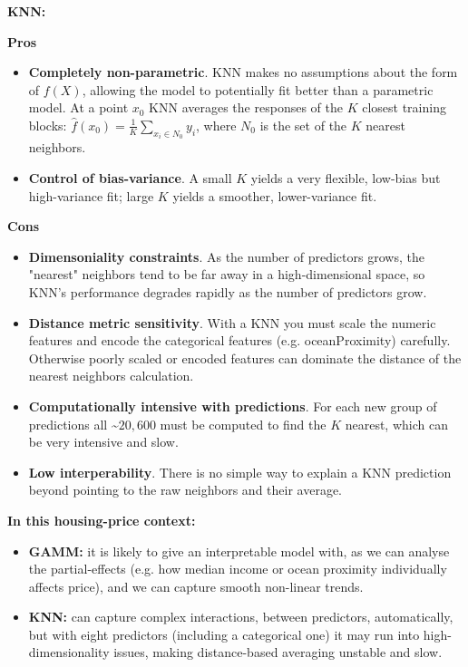 \documentclass[
]{article}
\begin{document}
\noindent \large \textbf{KNN:} \normalsize

\noindent \textbf{Pros}

\begin{itemize}
  \item \textbf{Completely non-parametric}. KNN makes no assumptions about the form of $f(X)$, allowing the model to potentially fit better than a      parametric model. At a point $x_0$ KNN averages the responses of the $K$ closest training blocks: $\hat{f}(x_{0}) = \frac{1}{K} \sum_{x_{i}           \in N_{0}}{y_i}$, where $N_0$ is the set of the $K$ nearest neighbors.
  \item \textbf{Control of bias-variance}. A small $K$ yields a very flexible, low-bias but high-variance fit; large $K$ yields a smoother,      lower-variance fit.
\end{itemize}

\noindent \textbf{Cons}

\begin{itemize}
  \item \textbf{Dimensoniality constraints}. As the number of predictors grows, the "nearest" neighbors tend to be far away in a high-dimensional       space, so KNN's performance degrades rapidly as the number of predictors grow.
  \item \textbf{Distance metric sensitivity}. With a KNN you must scale the numeric features and encode the categorical features (e.g.                  oceanProximity) carefully. Otherwise poorly scaled or encoded features can dominate the distance of the nearest neighbors calculation.
  \item \textbf{Computationally intensive with predictions}. For each new group of predictions all \textasciitilde$20,600$ must be computed to find     the $K$ nearest, which can be very intensive and slow.
  \item \textbf{Low interperability}. There is no simple way to explain a KNN prediction beyond pointing to the raw neighbors and their average.
\end{itemize}

\noindent \large \textbf{In this housing-price context: } \normalsize

\begin{itemize}
  \item \textbf{GAMM:} it is likely to give an interpretable model with, as we can analyse the partial-effects (e.g. how median income or ocean         proximity individually affects price), and we can capture smooth non-linear trends.
  \item \textbf{KNN:} can capture complex interactions, between predictors, automatically, but with eight predictors (including a categorical     one)   it may run into high-dimensionality issues, making distance-based averaging unstable and slow.
\end{itemize}
\end{document}
